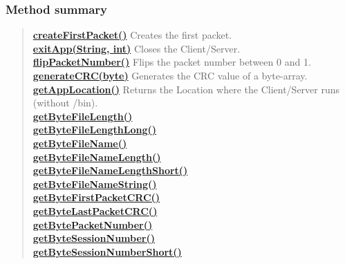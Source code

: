 {{{{\subsubsection{Method summary}{
\begin{verse}
\hyperlink{filetransferUDP.FileTransfer.createFirstPacket()}{{\bf createFirstPacket()}} Creates the first packet.\\
\hyperlink{filetransferUDP.FileTransfer.exitApp(java.lang.String, int)}{{\bf exitApp(String, int)}} Closes the Client/Server.\\
\hyperlink{filetransferUDP.FileTransfer.flipPacketNumber()}{{\bf flipPacketNumber()}} Flips the packet number between 0 and 1.\\
\hyperlink{filetransferUDP.FileTransfer.generateCRC(byte[])}{{\bf generateCRC(byte\lbrack \rbrack )}} Generates the CRC value of a byte-array.\\
\hyperlink{filetransferUDP.FileTransfer.getAppLocation()}{{\bf getAppLocation()}} Returns the Location where the Client/Server runs (without /bin).\\
\hyperlink{filetransferUDP.FileTransfer.getByteFileLength()}{{\bf getByteFileLength()}} \\
\hyperlink{filetransferUDP.FileTransfer.getByteFileLengthLong()}{{\bf getByteFileLengthLong()}} \\
\hyperlink{filetransferUDP.FileTransfer.getByteFileName()}{{\bf getByteFileName()}} \\
\hyperlink{filetransferUDP.FileTransfer.getByteFileNameLength()}{{\bf getByteFileNameLength()}} \\
\hyperlink{filetransferUDP.FileTransfer.getByteFileNameLengthShort()}{{\bf getByteFileNameLengthShort()}} \\
\hyperlink{filetransferUDP.FileTransfer.getByteFileNameString()}{{\bf getByteFileNameString()}} \\
\hyperlink{filetransferUDP.FileTransfer.getByteFirstPacketCRC()}{{\bf getByteFirstPacketCRC()}} \\
\hyperlink{filetransferUDP.FileTransfer.getByteLastPacketCRC()}{{\bf getByteLastPacketCRC()}} \\
\hyperlink{filetransferUDP.FileTransfer.getBytePacketNumber()}{{\bf getBytePacketNumber()}} \\
\hyperlink{filetransferUDP.FileTransfer.getByteSessionNumber()}{{\bf getByteSessionNumber()}} \\
\hyperlink{filetransferUDP.FileTransfer.getByteSessionNumberShort()}{{\bf getByteSessionNumberShort()}} \\

\end{verse}}}}}}
